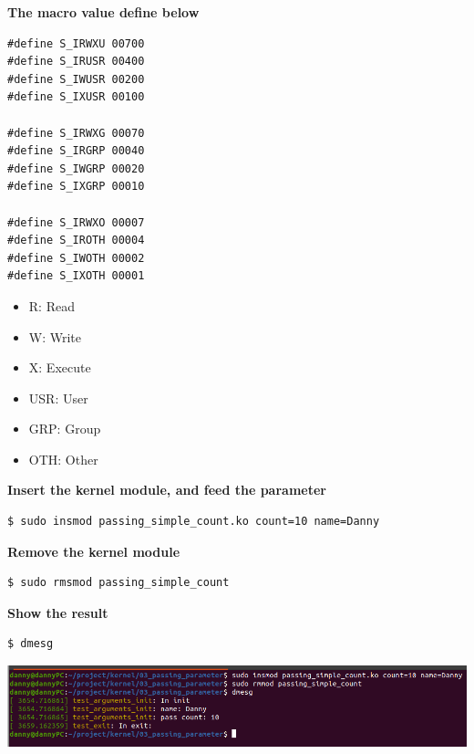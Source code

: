 \textbf{The macro value define below}
\begin{lstlisting}[style=CStyle]
#define S_IRWXU 00700
#define S_IRUSR 00400
#define S_IWUSR 00200
#define S_IXUSR 00100

#define S_IRWXG 00070
#define S_IRGRP 00040
#define S_IWGRP 00020
#define S_IXGRP 00010

#define S_IRWXO 00007
#define S_IROTH 00004
#define S_IWOTH 00002
#define S_IXOTH 00001
\end{lstlisting}

\begin{itemize}
    \item R: Read
    \item W: Write
    \item X: Execute
    \item USR: User
    \item GRP: Group
    \item OTH: Other
\end{itemize}

\textbf{Insert the kernel module, and feed the parameter}
\begin{lstlisting}[style=bashStyle]
    $ sudo insmod passing_simple_count.ko count=10 name=Danny
\end{lstlisting}

\textbf{Remove the kernel module}
\begin{lstlisting}[style=bashStyle]
    $ sudo rmsmod passing_simple_count
\end{lstlisting}

\textbf{Show the result}
\begin{lstlisting}[style=bashStyle]
    $ dmesg
\end{lstlisting}

\begin{center}
    \includegraphics[width=\linewidth]{images/03_pass_para_terminal.png}
\end{center}



